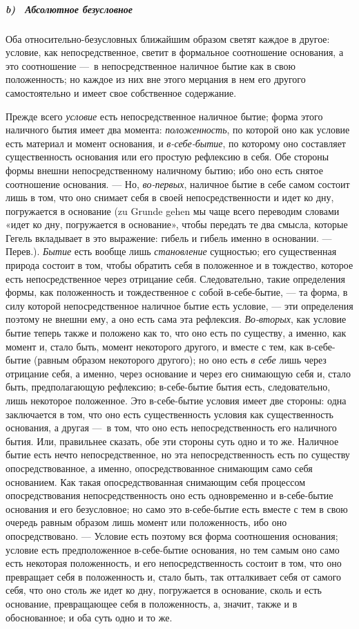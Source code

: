 \subparagraph[b) \ Абсолютное безусловное]{b) \ Абсолютное безусловное}
\hypertarget{Toc478978733}{}Оба относительно-безусловных ближайшим образом
светят каждое в другое: условие, как непосредственное, светит в формальное
соотношение основания, а это соотношение —~в непосредственное наличное
бытие как в свою положенность; но каждое из них вне этого мерцания в нем
его другого самостоятельно и имеет свое собственное содержание.

Прежде всего {\em условие} есть непосредственное
наличное бытие; форма этого наличного бытия имеет два момента:
{\em положенность}, по которой оно как условие есть
материал и момент основания, и {\em в-себе-бытие}, по
которому оно составляет существенность основания или его простую рефлексию
в себя. Обе стороны формы внешни непосредственному наличному бытию; ибо оно
есть снятое соотношение основания. — Но,
{\em во-первых}, наличное бытие в себе самом состоит
лишь в том, что оно снимает себя в своей непосредственности и идет ко дну,
погружается в основание (zu Grunde gehen мы чаще всего переводим словами
«идет ко дну, погружается в основание», чтобы передать те два смысла,
которые Гегель вкладывает в это выражение: гибель и гибель именно в
основании. — Перев.). {\em Бытие} есть вообще лишь
{\em становление} сущностью; его существенная природа
состоит в том, чтобы обратить себя в положенное и в тождество, которое есть
непосредственное через отрицание себя. Следовательно, такие определения
формы, как положенность и тождественное с собой в-себе-бытие, — та форма, в
силу которой непосредственное наличное бытие есть условие, — эти
определения поэтому не внешни ему, а оно есть сама эта рефлексия.
{\em Во-вторых}, как условие бытие теперь также и
положено как то, что оно есть по существу, а именно, как момент и, стало
быть, момент некоторого другого, и вместе с тем, как в-себе-бытие (равным
образом некоторого другого); но оно есть {\em в себе}
лишь через отрицание себя, а именно, через основание и через его снимающую
себя и, стало быть, предполагающую рефлексию; в-себе-бытие бытия есть,
следовательно, лишь некоторое положенное. Это в-себе-бытие условия имеет
две стороны: одна заключается в том, что оно есть существенность условия
как существенность основания, а другая —~в том, что оно есть
непосредственность его наличного бытия. Или, правильнее сказать, обе эти
стороны суть одно и то же. Наличное бытие есть нечто непосредственное, но
эта непосредственность есть по существу опосредствованное, а именно,
опосредствованное снимающим само себя основанием. Как такая
опосредствованная снимающим себя процессом опосредствования
непосредственность оно есть одновременно и в-себе-бытие основания и его
безусловное; но само это в-себе-бытие есть вместе с тем в свою очередь
равным образом лишь момент или положенность, ибо оно опосредствовано. —
Условие есть поэтому вся форма соотношения основания; условие есть
предположенное в-себе-бытие основания, но тем самым оно само есть некоторая
положенность, и его непосредственность состоит в том, что оно превращает
себя в положенность и, стало быть, так отталкивает себя от самого себя, что
оно столь же идет ко дну, погружается в основание, сколь и есть основание,
превращающее себя в положенность, а, значит, также и в обоснованное; и оба
суть одно и то же.

